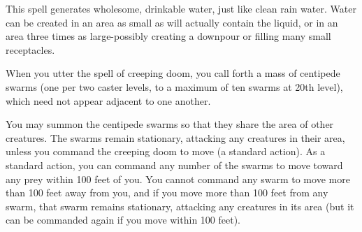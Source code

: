 \begin{multicols}{2}
\begin{small}

\noindent This spell generates wholesome, drinkable water, just like clean rain water. Water can be created in an area as small as will actually contain the liquid, or in an area three times as large-possibly creating a downpour or filling many small receptacles.


\noindent When you utter the spell of creeping doom, you call forth a mass of centipede swarms (one per two caster levels, to a maximum of ten swarms at 20th level), which need not appear adjacent to one another.

\smallskip\noindent You may summon the centipede swarms so that they share the area of other creatures. The swarms remain stationary, attacking any creatures in their area, unless you command the creeping doom to move (a standard action). As a standard action, you can command any number of the swarms to move toward any prey within 100 feet of you. You cannot command any swarm to move more than 100 feet away from you, and if you move more than 100 feet from any swarm, that swarm remains stationary, attacking any creatures in its area (but it can be commanded again if you move within 100 feet).


\end{small}
\end{multicols}
